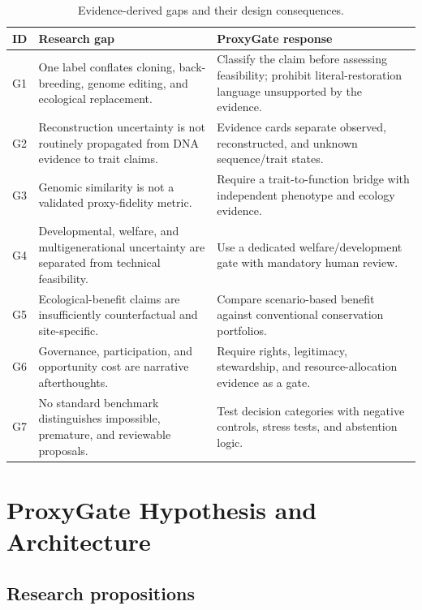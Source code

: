 \documentclass[conference]{IEEEtran}
\begin{document}
\begin{table}[t]
\caption{Evidence-derived gaps and their design consequences.}
\label{tab:gaps}
\centering
\footnotesize
\setlength{\tabcolsep}{3pt}
\begin{tabular}{p{} p{} p{}}
\toprule
\textbf{ID} & \textbf{Research gap} & \textbf{ProxyGate response} \\
\midrule
G1 & One label conflates cloning, back-breeding, genome editing, and ecological replacement. & Classify the claim before assessing feasibility; prohibit literal-restoration language unsupported by the evidence. \\
G2 & Reconstruction uncertainty is not routinely propagated from DNA evidence to trait claims. & Evidence cards separate observed, reconstructed, and unknown sequence/trait states. \\
G3 & Genomic similarity is not a validated proxy-fidelity metric. & Require a trait-to-function bridge with independent phenotype and ecology evidence. \\
G4 & Developmental, welfare, and multigenerational uncertainty are separated from technical feasibility. & Use a dedicated welfare/development gate with mandatory human review. \\
G5 & Ecological-benefit claims are insufficiently counterfactual and site-specific. & Compare scenario-based benefit against conventional conservation portfolios. \\
G6 & Governance, participation, and opportunity cost are narrative afterthoughts. & Require rights, legitimacy, stewardship, and resource-allocation evidence as a gate. \\
G7 & No standard benchmark distinguishes impossible, premature, and reviewable proposals. & Test decision categories with negative controls, stress tests, and abstention logic. \\
\bottomrule
\end{tabular}
\end{table}

\section{ProxyGate Hypothesis and Architecture}

\subsection{Research propositions}
\end{document}
